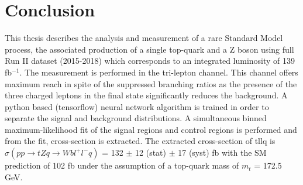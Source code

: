 
\chapter{Conclusion}
\label{chap:conclusion}

This thesis describes the analysis and measurement of a rare Standard Model process, the associated production of a single top-quark and a Z boson using full Run II dataset (2015-2018) which corresponds to an integrated luminosity of 139 fb$^{-1}$. The measurement is performed in the tri-lepton channel. This channel offers maximum reach in spite of the suppressed branching ratios as the presence of the three charged leptons in the final state significantly reduces the background. A python based (tensorflow) neural network algorithm is  trained in  order to separate the signal and background distributions. A simultaneous binned maximum-likelihood fit of the signal regions and control regions  is performed and from the fit, cross-section is extracted. The extracted cross-section of tllq is $\sigma(pp\rightarrow tZq \rightarrow Wbl^{+}l^{-}q)$ = 132  $\pm$ 12  (stat) $\pm$ 17 (syst) fb with the SM prediction of 102 fb under the assumption of a top-quark mass of $m_{t}$ = 172.5 GeV.


